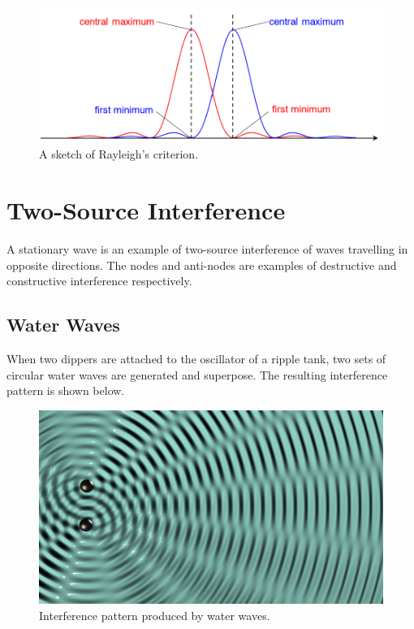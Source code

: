 \begin{figure}[H]
    \centering
    \includegraphics[scale=1]{media/Rayleigh's Criterion.png}
    \caption{A sketch of Rayleigh's criterion.\protect\footnotemark}
\end{figure}

\section{Two-Source Interference}

A stationary wave is an example of two-source interference of waves travelling in opposite directions. The nodes and anti-nodes are examples of destructive and constructive interference respectively.

\subsection{Water Waves}

When two dippers are attached to the oscillator of a ripple tank, two sets of circular water waves are generated and superpose. The resulting interference pattern is shown below.

\begin{figure}[H]
    \centering
    \includegraphics[scale=0.2]{media/Water Wave Interference Pattern.jpg}
    \caption{Interference pattern produced by water waves.\protect\footnotemark}
\end{figure}

